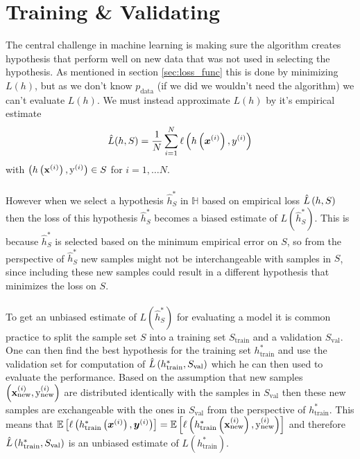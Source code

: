 \section{Training \& Validating} \label{sec:train_val}
The central challenge in machine learning is making sure the algorithm creates hypothesis that perform well on new data that was not used in selecting the hypothesis. As mentioned in section \ref{sec:loss_func} this is done by minimizing $L(h)$, but as we don't know $p_\text{data}$ (if we did we wouldn't need the algorithm) we can't evaluate $L(h)$. We must instead approximate $L(h)$ by it's empirical estimate 
\begin{equation*}
    \hat{L}(h,S)= \frac{1}{N} \sum_{i=1}^N \ell \left (h\left (\boldsymbol{x}^{(i)}\right), y^{(i)}\right)
\end{equation*}
with $\left ( h\left (\mathbf{x}^{(i)}\right), \text{y}^{(i)}\right) \in S$ for $i = 1, \dots N$.\\
\\
However when we select a hypothesis $\hat{h}^*_S$ in $\mathbb{H}$ based on empirical loss $\hat{L} \left (h, S\right)$ then the loss of this hypothesis $\hat{h}^*_S$ becomes a biased estimate of $L(\hat{h}^*_S)$. This is because $\hat{h}^*_S$ is selected based on the minimum empirical error on $S$, so from the perspective of $\hat{h}^*_S$ new samples might not be interchangeable with samples in $S$, since including these new samples could result in a different hypothesis that minimizes the loss on $S$. \\
\\
To get an unbiased estimate of $L(\hat{h}^*_S)$ for evaluating a model it is common practice to split the sample set $S$ into a training set $S_\text{train}$ and a validation $S_\text{val}$. One can then find the best hypothesis for the training set $h^*_\text{train}$ and use the validation set for computation of $\hat{L}\left (h^*_\text{train}, S_\text{val}\right)$ which he can then used to evaluate the performance. Based on the assumption that new samples $\left (\mathbf{x}^{(i)}_{\text{new}}, \text{y}^{(i)}_{\text{new}}\right)$ are distributed identically with the samples in $S_\text{val}$ then these new samples are exchangeable with the ones in $S_\text{val}$ from the perspective of $h^*_\text{train}$. This means that $\E \lrs{\ell \lr{h^*_\text{train} \lr{\boldsymbol{x}^{(i)}}, \boldsymbol{y}^{(i)}}} = \E \lrs{\ell \lr{h^*_\text{train} \lr{\mathbf{x}^{(i)}_{\text{new}}}, \text{y}_{\text{new}}^{(i)}}}$ and therefore $\hat{L}\left (h^*_\text{train}, S_\text{val}\right)$ is an unbiased estimate of $L(h^*_\text{train})$.

